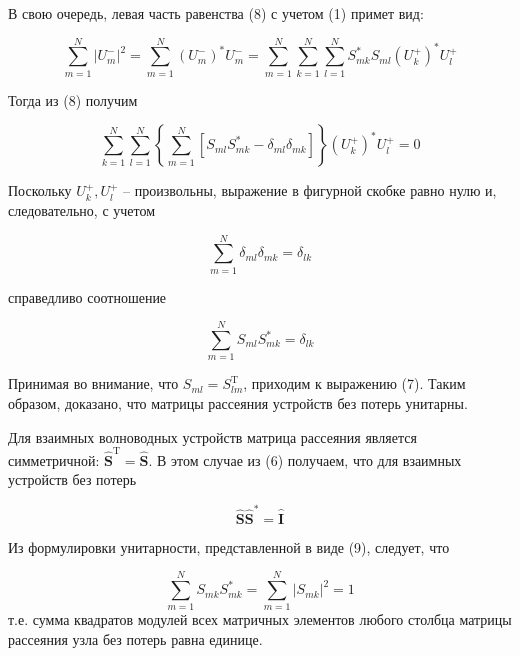 ﻿\documentclass[a4paper,11pt]{article}
\begin{document}
В свою очередь, левая часть равенства (8) с учетом (1) примет вид: 

\begin{equation}
	\sum _ { m = 1 } ^ { N } \left| U _ { m } ^ { - } \right| ^ { 2 } = \sum _ { m = 1 } ^ { N } \left( U _ { m } ^ { - } \right) ^ { * } U _ { m } ^ { - } = \sum _ { m = 1 } ^ { N } \sum _ { k = 1 } ^ { N } \sum _ { l = 1 } ^ { N } S _ { m k } ^ { * } S _ { m l } \left( U _ { k } ^ { + } \right) ^ { * } U _ { l } ^ { + }
\end{equation}


Тогда из (8) получим

\begin{equation}
	\sum _ { k = 1 } ^ { N } \sum _ { l = 1 } ^ { N } \left\{ \sum _ { m = 1 } ^ { N } \left[ S _ { m l } S _ { m k } ^ { * } - \delta _ { m l } \delta _ { m k } \right] \right\} \left( U _ { k } ^ { + } \right) ^ { * } U _ { l } ^ { + } = 0
\end{equation}

Поскольку $U_k^+, U_l^+$ -- произвольны, выражение в фигурной скобке равно нулю и, следовательно, с учетом

\begin{equation}
	\sum _ { m = 1 } ^ { N } \delta _ { m l } \delta _ { m k } = \delta _ { l k }
\end{equation}

справедливо соотношение

\begin{equation}
	\sum _ { m = 1 } ^ { N } S _ { m l } S _ { m k } ^ { * } = \delta _ { l k }
\end{equation}	

Принимая во внимание, что $S _ { m l } = S _ { l m } ^ { \mathrm { T } }$, приходим к выражению (7). 
Таким образом, доказано, что матрицы рассеяния устройств без потерь унитарны.



Для взаимных волноводных устройств матрица рассеяния является симметричной: $\hat { \mathbf { S } } ^ { \mathrm { T } } = \hat { \mathbf { S } }$. В этом случае из (6) получаем, что для взаимных устройств без потерь

\begin{equation}
	\hat { \mathbf { S } } \hat { \mathbf { S } } ^ { * } = \hat { \mathbf { I } }
\end{equation}

Из формулировки унитарности, представленной в виде (9), следует, что 

\begin{equation}
	\sum _ { m = 1 } ^ { N } S _ { m k } S _ { m k } ^ { * } = \sum _ { m = 1 } ^ { N } \left| S _ { m k } \right| ^ { 2 } = 1
\end{equation}
т.е. сумма квадратов модулей всех матричных элементов любого столбца матрицы рассеяния узла без потерь равна единице. 
\end{document}
